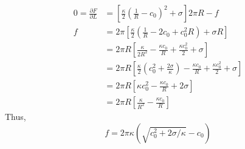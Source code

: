 \documentclass[11pt]{article}
\begin{document}
\begin{align*}
    0 = \frac{\partial F}{\partial L} & = \left[ \frac{\kappa}{2} \left(\frac{1}{R} - c_0\right)^2 + \sigma\right] 2\pi R - f                                                           \\
    f                                 & = 2\pi \left[ \frac{\kappa}{2}\left( \frac{1}{R} - 2 c_0 + c_0^2 R\right) + \sigma R\right]                                                     \\
                                      & = 2 \pi R \left[ \frac{\kappa}{2R^2}- \frac{\kappa c_0}{R}  + \frac{\kappa c_0^2}{2} + \sigma\right]                                            \\
                                      & = 2 \pi R \left[ \frac{\kappa}{2} \left(c_0^2 + \frac{2\sigma}{\kappa}\right) - \frac{\kappa c_0}{R}   + \frac{\kappa c_0^2}{2} + \sigma\right] \\
                                      & = 2\pi R \left[\kappa c_0^2 - \frac{\kappa c_0}{R}  + 2 \sigma\right]                                                                           \\
                                      & = 2\pi R\left[\frac{\kappa}{R^2} - \frac{\kappa c_0}{R}\right]
\end{align*}
Thus,
\begin{equation}
    \boxed{  f=  2\pi \kappa \left(\sqrt{c_0^2 + 2\sigma/\kappa}- c_0\right)}
\end{equation}
\printbibliography
\end{document}
